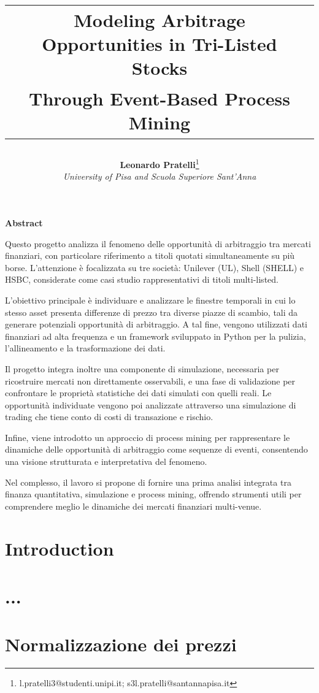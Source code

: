 \documentclass[10pt,final]{article}
\date{}
\title{%
{\large\bfseries\selectfont
\begin{tabular}{c}
Modeling Arbitrage Opportunities in Tri-Listed Stocks \\ [0.3em]
Through Event-Based Process Mining
\end{tabular}
}%
}
\author{%
  \textbf{Leonardo Pratelli}\thanks{l.pratelli3@studenti.unipi.it; s3l.pratelli@santannapisa.it}\\[0.7em]
  \textit{University of Pisa and Scuola Superiore Sant'Anna}
}
\begin{document}
\maketitle

\begin{center}
{\large\bfseries Abstract}
\end{center}

Questo progetto analizza il fenomeno delle opportunità di arbitraggio tra mercati finanziari, con particolare riferimento a titoli quotati simultaneamente su più borse. L’attenzione è focalizzata su tre società: Unilever (UL), Shell (SHELL) e HSBC, considerate come casi studio rappresentativi di titoli multi-listed.

L’obiettivo principale è individuare e analizzare le finestre temporali in cui lo stesso asset presenta differenze di prezzo tra diverse piazze di scambio, tali da generare potenziali opportunità di arbitraggio. A tal fine, vengono utilizzati dati finanziari ad alta frequenza e un framework sviluppato in Python per la pulizia, l’allineamento e la trasformazione dei dati.

Il progetto integra inoltre una componente di simulazione, necessaria per ricostruire mercati non direttamente osservabili, e una fase di validazione per confrontare le proprietà statistiche dei dati simulati con quelli reali. Le opportunità individuate vengono poi analizzate attraverso una simulazione di trading che tiene conto di costi di transazione e rischio.

Infine, viene introdotto un approccio di process mining per rappresentare le dinamiche delle opportunità di arbitraggio come sequenze di eventi, consentendo una visione strutturata e interpretativa del fenomeno.

Nel complesso, il lavoro si propone di fornire una prima analisi integrata tra finanza quantitativa, simulazione e process mining, offrendo strumenti utili per comprendere meglio le dinamiche dei mercati finanziari multi-venue.

\section{Introduction}


\section{...}


\section{Normalizzazione dei prezzi}
\end{document}
